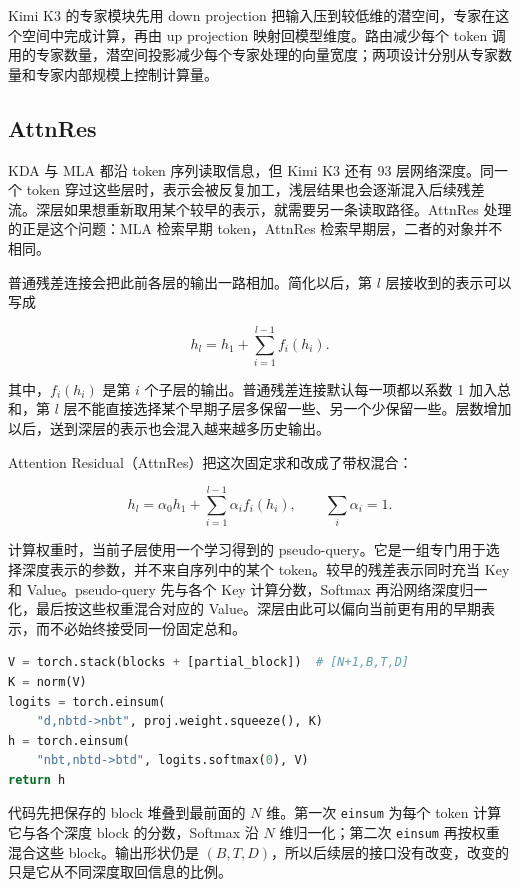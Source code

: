 Kimi K3 的专家模块先用 down projection 把输入压到较低维的潜空间，专家在这个空间中完成计算，再由 up projection 映射回模型维度。路由减少每个 token 调用的专家数量，潜空间投影减少每个专家处理的向量宽度；两项设计分别从专家数量和专家内部规模上控制计算量。

\subsection{AttnRes}

KDA 与 MLA 都沿 token 序列读取信息，但 Kimi K3 还有 93 层网络深度。同一个 token 穿过这些层时，表示会被反复加工，浅层结果也会逐渐混入后续残差流。深层如果想重新取用某个较早的表示，就需要另一条读取路径。AttnRes 处理的正是这个问题：MLA 检索早期 token，AttnRes 检索早期层，二者的对象并不相同。

普通残差连接会把此前各层的输出一路相加。简化以后，第 $l$ 层接收到的表示可以写成

\[
h_l=h_1+\sum_{i=1}^{l-1}f_i(h_i).
\]

其中，$f_i(h_i)$ 是第 $i$ 个子层的输出。普通残差连接默认每一项都以系数 1 加入总和，第 $l$ 层不能直接选择某个早期子层多保留一些、另一个少保留一些。层数增加以后，送到深层的表示也会混入越来越多历史输出。

Attention Residual（AttnRes）把这次固定求和改成了带权混合：

\nopagebreak[4]

\[
h_l=
\alpha_0h_1+
\sum_{i=1}^{l-1}\alpha_i f_i(h_i),
\qquad
\sum_i\alpha_i=1.
\]

计算权重时，当前子层使用一个学习得到的 pseudo-query。它是一组专门用于选择深度表示的参数，并不来自序列中的某个 token。较早的残差表示同时充当 Key 和 Value。pseudo-query 先与各个 Key 计算分数，Softmax 再沿网络深度归一化，最后按这些权重混合对应的 Value。深层由此可以偏向当前更有用的早期表示，而不必始终接受同一份固定总和。

\begin{lstlisting}[language=Python,caption={blockwise AttnRes 的核心操作}]
V = torch.stack(blocks + [partial_block])  # [N+1,B,T,D]
K = norm(V)
logits = torch.einsum(
    "d,nbtd->nbt", proj.weight.squeeze(), K)
h = torch.einsum(
    "nbt,nbtd->btd", logits.softmax(0), V)
return h
\end{lstlisting}

代码先把保存的 block 堆叠到最前面的 $N$ 维。第一次 \texttt{einsum} 为每个 token 计算它与各个深度 block 的分数，Softmax 沿 $N$ 维归一化；第二次 \texttt{einsum} 再按权重混合这些 block。输出形状仍是 $(B,T,D)$，所以后续层的接口没有改变，改变的只是它从不同深度取回信息的比例。


